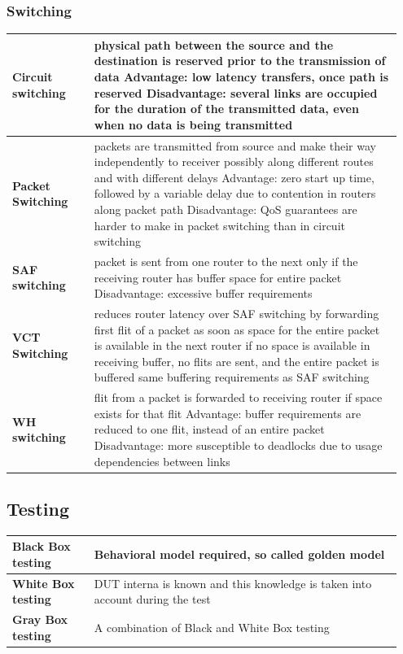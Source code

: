 		\subsubsection{Switching}
			\begin{longtable}{|>{\bfseries}p{0.2\linewidth}|p{0.75\linewidth}|}
				\hline
				Circuit switching
				&
				physical path between the source and the destination is reserved prior to the transmission of data \newline
				Advantage: low latency transfers, once path is reserved \newline
				Disadvantage: several links are occupied for the duration of the transmitted data, even when no data is	being transmitted \\
				\hline
				Packet Switching
				&
				packets are transmitted from source and make their way independently to receiver possibly along different routes and with different delays \newline
				Advantage: zero start up time, followed by a variable delay due to contention in routers along packet path \newline
				Disadvantage: QoS guarantees are harder to make in packet switching than in circuit switching\\
				\hline
				SAF switching
				&
				packet is sent from one router to the next only if the receiving router has buffer space for entire	packet \newline
				Disadvantage: excessive buffer requirements \\
				\hline
				VCT Switching
				&
				reduces router latency over SAF switching by forwarding first flit of a packet as soon as space for	the entire packet is available in the next router \newline
				if no space is available in receiving buffer, no flits are sent, and the entire packet is buffered same buffering requirements as SAF switching \\
				\hline
				WH switching
				&
				flit from a packet is forwarded to receiving router if space exists for that flit \newline
				Advantage: buffer requirements are reduced to one flit, instead of an entire packet \newline
				Disadvantage: more susceptible to deadlocks due to usage dependencies between links \\
				\hline
			\end{longtable}
		
	\subsection{Testing}
		\begin{longtable}{|>{\bfseries}p{0.2\linewidth}|p{0.75\linewidth}|}
			\hline
			Black Box testing 
			& Behavioral model required, so called golden model \\
			\hline
			White Box testing
			& DUT interna is known and this knowledge is taken into account during the test \\
			\hline
			Gray Box testing
			& A combination of Black and White Box testing \\
			\hline
		\end{longtable}